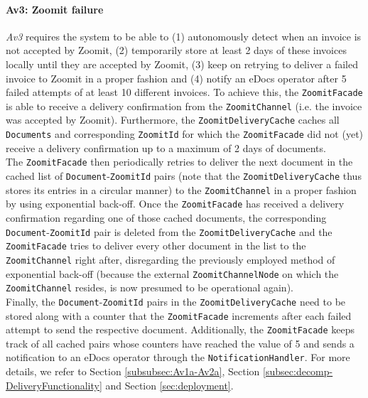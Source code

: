 \documentclass[a4paper,10pt]{article}
\begin{document}
\paragraph{Av3: Zoomit failure}
\textit{Av3} requires the system to be able to (1) autonomously detect when an invoice is not accepted by Zoomit, (2) temporarily store at least 2 days of these invoices locally until they are accepted by Zoomit, (3) keep on retrying to deliver a failed invoice to Zoomit in a proper fashion and (4) notify an eDocs operator after 5 failed attempts of at least 10 different invoices. To achieve this, the \texttt{ZoomitFacade} is able to receive a delivery confirmation from the \texttt{ZoomitChannel} (i.e. the invoice was accepted by Zoomit). Furthermore, the \texttt{ZoomitDeliveryCache} caches all \texttt{Documents} and corresponding \texttt{ZoomitId} for which the \texttt{ZoomitFacade} did not (yet) receive a delivery confirmation up to a maximum of 2 days of documents.\\
The \texttt{ZoomitFacade} then periodically retries to deliver the next document in the cached list of \texttt{Document}-\texttt{ZoomitId} pairs (note that the \texttt{ZoomitDeliveryCache} thus stores its entries in a circular manner) to the \texttt{ZoomitChannel} in a proper fashion by using exponential back-off. Once the \texttt{ZoomitFacade} has received a delivery confirmation regarding one of those cached documents, the corresponding \texttt{Document}-\texttt{ZoomitId} pair is deleted from the \texttt{ZoomitDeliveryCache} and the \texttt{ZoomitFacade} tries to deliver every other document in the list to the \texttt{ZoomitChannel} right after, disregarding the previously employed method of exponential back-off (because the external \texttt{ZoomitChannelNode} on which the \texttt{ZoomitChannel} resides, is now presumed to be operational again).\\
Finally, the \texttt{Document}-\texttt{ZoomitId} pairs in the \texttt{ZoomitDeliveryCache} need to be stored along with a counter that the \texttt{ZoomitFacade} increments after each failed attempt to send the respective document. Additionally, the \texttt{ZoomitFacade} keeps track of all cached pairs whose counters have reached the value of 5 and sends a notification to an eDocs operator through the \texttt{NotificationHandler}.
For more details, we refer to Section \ref{subsubsec:Av1a-Av2a}, Section \ref{subsec:decomp-DeliveryFunctionality} and Section \ref{sec:deployment}.
\end{document}
